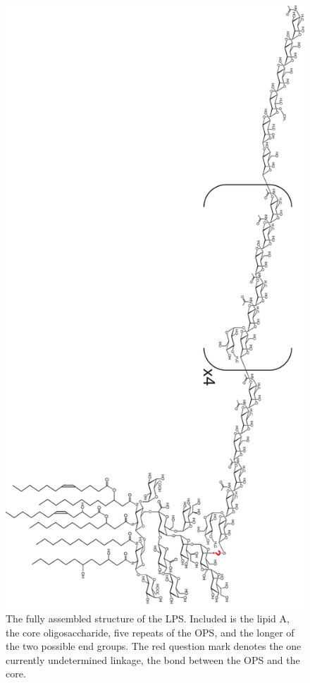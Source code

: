 \begin{figure}[p]
  	\begin{center}
   		\includegraphics[height=0.89\textheight]{conclusion_chapter/img/fulllps.pdf}
   	\end{center}
   	\caption[The complete structure of the \caulobacter \ac{LPS}]{The fully
      assembled structure of the \caulobacter \ac{LPS}. Included is the lipid A,
    the core oligosaccharide, five repeats of the \ac{OPS}, and the longer of
    the two possible end groups. The red question mark denotes the one currently
  undetermined linkage, the bond between the \ac{OPS} and the core.}
\label{fig:fulllps}
\end{figure}

